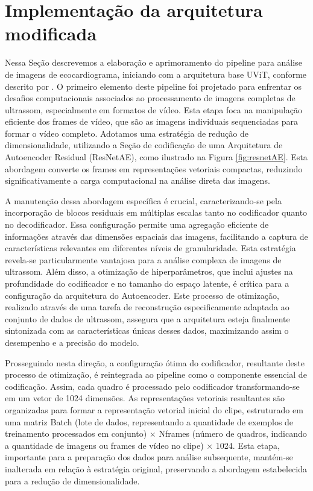 \section{Implementação da arquitetura modificada}
\label{Implementação da arquitetura modificada}

Nessa Seção descrevemos a elaboração e aprimoramento do pipeline para análise de imagens de ecocardiograma, iniciando com a arquitetura base UViT, conforme descrito por \textcite{Reynald}. O primeiro elemento deste pipeline foi projetado para enfrentar os desafios computacionais associados ao processamento de imagens completas de ultrassom, especialmente em formatos de vídeo. Esta etapa foca na manipulação eficiente dos frames de vídeo, que são as imagens individuais sequenciadas para formar o vídeo completo. Adotamos uma estratégia de redução de dimensionalidade, utilizando a Seção de codificação de uma Arquitetura de Autoencoder Residual (ResNetAE), como ilustrado na Figura \ref{fig:resnetAE}. Esta abordagem converte os frames em representações vetoriais compactas, reduzindo significativamente a carga computacional na análise direta das imagens.

A manutenção dessa abordagem específica é crucial, caracterizando-se pela incorporação de blocos residuais em múltiplas escalas tanto no codificador quanto no decodificador. Essa configuração permite uma agregação eficiente de informações através das dimensões espaciais das imagens, facilitando a captura de características relevantes em diferentes níveis de granularidade. Esta estratégia revela-se particularmente vantajosa para a análise complexa de imagens de ultrassom. Além disso, a otimização de hiperparâmetros, que inclui ajustes na profundidade do codificador e no tamanho do espaço latente, é crítica para a configuração da arquitetura do Autoencoder. Este processo de otimização, realizado através de uma tarefa de reconstrução especificamente adaptada ao conjunto de dados de ultrassom, assegura que a arquitetura esteja finalmente sintonizada com as características únicas desses dados, maximizando assim o desempenho e a precisão do modelo.

Prosseguindo nesta direção, a configuração ótima do codificador, resultante deste processo de otimização, é reintegrada ao pipeline como o componente essencial de codificação. Assim, cada quadro é processado pelo codificador transformando-se em um vetor de 1024 dimensões. As representações vetoriais resultantes são organizadas para formar a representação vetorial inicial do clipe, estruturado em uma matriz Batch (lote de dados, representando a quantidade de exemplos de treinamento processados em conjunto) × Nframes (número de quadros, indicando a quantidade de imagens ou frames de vídeo no clipe) × 1024. Esta etapa, importante para a preparação dos dados para análise subsequente, mantém-se inalterada em relação à estratégia original, preservando a abordagem estabelecida para a redução de dimensionalidade.


